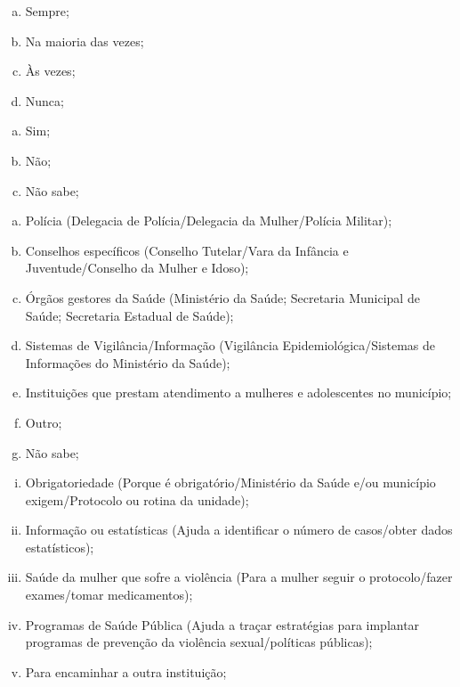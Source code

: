 \documentclass{article}
\begin{document}
\begin{enumerate}[a)]
\item
Sempre;

\item
Na maioria das vezes;

\item
Às vezes;

\item
Nunca;

\end{enumerate}
\begin{enumerate}[a)]
\item
Sim;

\item
Não;

\item
Não sabe;

\end{enumerate}
\begin{enumerate}[a)]
\item
Polícia (Delegacia de Polícia/Delegacia da Mulher/Polícia Militar);

\item
Conselhos específicos (Conselho Tutelar/Vara da Infância e Juventude/Conselho da
Mulher e Idoso);

\item
Órgãos gestores da Saúde (Ministério da Saúde; Secretaria Municipal de Saúde;
Secretaria Estadual de Saúde);

\item
Sistemas de Vigilância/Informação (Vigilância Epidemiológica/Sistemas de
Informações do Ministério da Saúde);

\item
Instituições que prestam atendimento a mulheres e adolescentes no município;

\item
Outro;

\item
Não sabe;

\end{enumerate}
\begin{enumerate}[i.]
\item
Obrigatoriedade (Porque é obrigatório/Ministério da Saúde e/ou município
exigem/Protocolo ou rotina da unidade);

\item
Informação ou estatísticas (Ajuda a identificar o número de casos/obter dados
estatísticos);

\item
Saúde da mulher que sofre a violência (Para a mulher seguir o protocolo/fazer
exames/tomar medicamentos);

\item
Programas de Saúde Pública (Ajuda a traçar estratégias para implantar programas
de prevenção da violência sexual/políticas públicas);

\item
Para encaminhar a outra instituição;

\end{enumerate}
\end{document}
